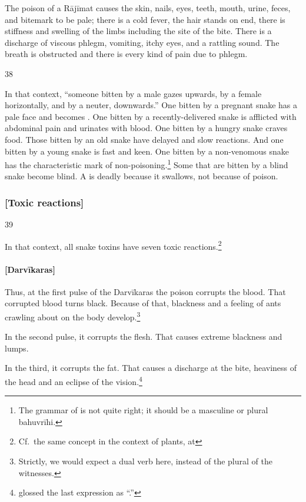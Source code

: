\begin{translation}
The poison of a Rājīmat causes the skin, nails, eyes, teeth, mouth,
urine, feces, and bitemark to be pale; there  is a cold fever, the hair
stands on end, there is stiffness and swelling of the limbs including the
site of the bite. There is a discharge of viscous phlegm, vomiting, itchy
eyes, and a rattling sound.  The breath is obstructed and there is every
kind of pain due to phlegm.


\item[38]

In that context, “someone bitten by a male gazes upwards,   by a female
horizontally, and by a neuter, downwards.” One bitten by a pregnant snake
has a pale face and becomes . One bitten by a
recently-delivered snake is afflicted with abdominal pain and urinates
with blood. One bitten by a hungry snake craves food.  Those bitten by an
old snake have delayed and slow reactions. And one bitten by a young
snake is fast and keen.  One bitten by a non-venomous snake has the
characteristic mark of non-poisoning.\footnote{The grammar of
     is not quite right; it should be a masculine or plural
    bahuvrīhi.} Some that are bitten by a blind snake become blind.  A
     is deadly because it swallows, not because of
    poison.

\subsubsection{[Toxic reactions]}

\item[39]

In that context, all snake toxins have seven toxic reactions.\footnote{Cf.\ the same concept in the context of plants, at 
\pageref{stagesofshock}}

\paragraph{[Darvīkaras]}   

Thus, at the first pulse of the Darvīkaras the poison corrupts the blood.
That corrupted blood turns black.  Because of that, blackness and a
feeling of ants crawling about on the body develop.\footnote{Strictly, we
    would expect a dual verb here, instead of the plural of the witnesses.}

In the second pulse, it corrupts the flesh.  That causes extreme blackness and  
lumps. 

In the third, it corrupts the fat. That causes a discharge at the bite,
heaviness of the head and an eclipse of the
vision.\footnote{ glossed the last expression as
    “.”}
    

\end{translation}
